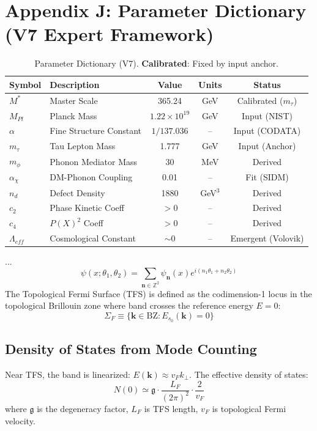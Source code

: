 \documentclass[a4paper,12pt]{article}
\begin{document}
\section{Appendix J: Parameter Dictionary (V7 Expert Framework)}
\begin{table}[H]
\centering
\small
\begin{tabular}{llccc}
\toprule
\textbf{Symbol} & \textbf{Description} & \textbf{Value} & \textbf{Units} & \textbf{Status} \\
\midrule
$M^*$ & Master Scale & 365.24 & GeV & Calibrated ($m_\tau$) \\
$M_{Pl}$ & Planck Mass & $1.22 \times 10^{19}$ & GeV & Input (NIST) \\
$\alpha$ & Fine Structure Constant & $1/137.036$ & -- & Input (CODATA) \\
$m_\tau$ & Tau Lepton Mass & 1.777 & GeV & Input (Anchor) \\
$m_\phi$ & Phonon Mediator Mass & 30 & MeV & Derived \\
$\alpha_\chi$ & DM-Phonon Coupling & 0.01 & -- & Fit (SIDM) \\
$n_d$ & Defect Density & 1880 & GeV$^3$ & Derived \\
$c_2$ & Phase Kinetic Coeff & $> 0$ & -- & Derived \\
$c_4$ & $P(X)^2$ Coeff & $> 0$ & -- & Derived \\
$\Lambda_{eff}$ & Cosmological Constant & $\sim 0$ & -- & Emergent (Volovik) \\
\bottomrule
\end{tabular}
\caption{Parameter Dictionary (V7). \textbf{Calibrated}: Fixed by input anchor.}
\end{table}
...
\begin{equation}
 \psi(x; \theta_1, \theta_2) = \sum_{\mathbf{n} \in \mathbb{Z}^2} \psi_{\mathbf{n}}(x) e^{i(n_1\theta_1 + n_2\theta_2)}
\end{equation}
The Topological Fermi Surface (TFS) is defined as the codimension-1 locus in the topological Brillouin zone where band crosses the reference energy $E=0$:
\begin{equation}
 \Sigma_F \equiv \{ \mathbf{k} \in \text{BZ} : E_{s_0}(\mathbf{k}) = 0 \}
\end{equation}


\subsection{Density of States from Mode Counting}
Near TFS, the band is linearized: $E(\mathbf{k}) \approx v_F k_\perp$. The effective density of states:
\begin{equation}
 N(0) \simeq \mathfrak{g} \cdot \frac{L_F}{(2\pi)^2} \cdot \frac{2}{v_F}
\end{equation}
where $\mathfrak{g}$ is the degeneracy factor, $L_F$ is TFS length, $v_F$ is topological Fermi velocity.
\end{document}
